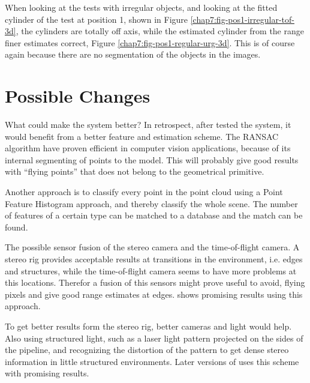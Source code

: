 When looking at the tests with irregular objects, and looking at the fitted cylinder of
the test at position 1, shown in Figure \ref{chap7:fig-pos1-irregular-tof-3d}, the
cylinders are totally off axis, while the estimated cylinder from the range finer
estimates correct, Figure \ref{chap7:fig-pos1-regular-urg-3d}. This is of course again
because there are no segmentation of the objects in the images. 


\section{Possible Changes}
What could make the system better? In retrospect, after tested the system, it would
benefit from a better feature and estimation scheme. The RANSAC algorithm have proven
efficient in computer vision applications, because of its internal segmenting of points to
the model. This will probably give good results with ``flying points'' that does not
belong to the geometrical primitive. 

Another approach is to classify every point in the point cloud using a Point
Feature Histogram approach, and thereby classify the whole scene. The number of features
of a certain type can be matched to a database and the match can be found. 

The possible sensor fusion of the stereo camera and the time-of-flight camera. A stereo
rig provides acceptable results at transitions in the environment, i.e. edges and
structures, while the time-of-flight camera seems to have more problems at this locations.
Therefor a fusion of this sensors might prove useful to avoid, flying pixels and give good
range estimates at edges. \cite{tof-stereo-fusion} shows promising results using this
approach. 

To get better results form the stereo rig, better cameras and light would help. Also using
structured light, such as a laser light pattern projected on the sides of the pipeline,
and recognizing the distortion of the pattern to get dense stereo information in little
structured environments. Later versions of \cite{MAKRO} uses this scheme with promising
results. 



